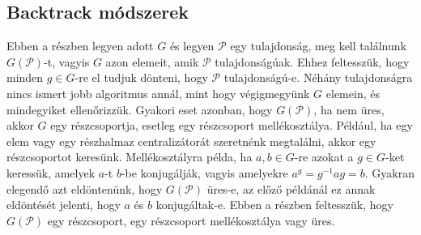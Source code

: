 \subsection{Backtrack módszerek}
\label{subsec:permbt}
Ebben a részben legyen adott $G$ és legyen $\mathcal{P}$ egy tulajdonság, meg kell találnunk $G(\mathcal{P})$-t, vagyis $G$ azon elemeit, amik $\mathcal{P}$ tulajdonságúak.
Ehhez feltesszük, hogy minden $g \in G$-re el tudjuk dönteni, hogy $\mathcal{P}$ tulajdonságú-e.
Néhány tulajdonságra nincs ismert jobb algoritmus annál, mint hogy végigmegyünk $G$ elemein, és mindegyiket ellenőrizzük.
Gyakori eset azonban, hogy $G(\mathcal{P})$, ha nem üres, akkor $G$ egy részcsoportja, esetleg egy részcsoport mellékosztálya.
Például, ha egy elem vagy egy részhalmaz centralizátorát szeretnénk megtalálni, akkor egy részcsoportot keresünk.
Mellékosztályra példa, ha $a, b \in G$-re azokat a $g \in G$-ket keressük, amelyek $a$-t $b$-be konjugálják, vagyis amelyekre $a^g = g^{-1}ag = b$.
Gyakran elegendő azt eldöntenünk, hogy $G(\mathcal{P})$ üres-e, az előző példánál ez annak eldöntését jelenti, hogy $a$ és $b$ konjugáltak-e.
Ebben a részben feltesszük, hogy $G(\mathcal{P})$ egy részcsoport, egy részcsoport mellékosztálya vagy üres.

